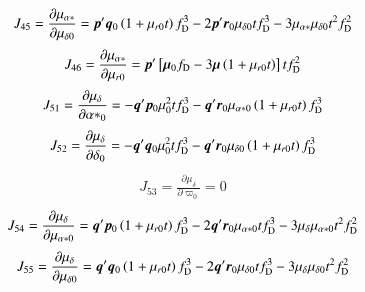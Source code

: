 \documentclass{aa}
\def\vec#1{\ensuremath{\mathchoice{\mbox{\boldmath$\displaystyle#1$}}
{\mbox{\boldmath$\textstyle#1$}}
{\mbox{\boldmath$\scriptstyle#1$}}
{\mbox{\boldmath$\scriptscriptstyle#1$}}}}
\begin{document}
\begin{equation*}
 \begin{aligned}
    J_{45}=\frac{\partial\mu_{\alpha*}}{\partial\mu_{\delta0}} =
    \vec{p}'\vec{q}_0\left(1+\mu_{r0}t\right)f_\mathrm{D}^3
    -2\vec{p}'\vec{r}_0\mu_{\delta0}tf_\mathrm{D}^3
    -3\mu_{\alpha*}\mu_{\delta0}t^2f_\mathrm{D}^2 \\
 \end{aligned}
\end{equation*}
\begin{equation*}
 \begin{aligned}
    J_{46}=\frac{\partial\mu_{\alpha*}}{\partial\mu_{r0}}=
    \vec{p}'\left[\vec{\mu}_0f_\mathrm{D}-3\vec{\mu}\left(1+\mu_{r0}t\right)\right]tf_\mathrm{D}^2
 \end{aligned}
\end{equation*}
\begin{equation*}
 \begin{aligned}
    J_{51}=\frac{\partial\mu_\delta}{\partial{\alpha*}_0}=
    -\vec{q}'\vec{p}_0\mu_0^2tf_\mathrm{D}^3
    -\vec{q}'\vec{r}_0\mu_{\alpha*0}\left(1+\mu_{r0}t\right)f_\mathrm{D}^3
 \end{aligned}
\end{equation*}
\begin{equation*}
 \begin{aligned}
    J_{52}=\frac{\partial\mu_\delta}{\partial\delta_0}=
    -\vec{q}'\vec{q}_0\mu_0^2tf_\mathrm{D}^3
    -\vec{q}'\vec{r}_0\mu_{\delta0}\left(1+\mu_{r0}t\right)f_\mathrm{D}^3
 \end{aligned}
\end{equation*}
\begin{equation*}
 \begin{aligned}
    J_{53}=\frac{\partial\mu_\delta}{\partial\varpi_0}=0
 \end{aligned}
\end{equation*}
\begin{equation*}
 \begin{aligned}
    J_{54}=\frac{\partial\mu_\delta}{\partial\mu_{\alpha*0}} =
    \vec{q}'\vec{p}_0\left(1+\mu_{r0}t\right)f_\mathrm{D}^3
    -2\vec{q}'\vec{r}_0\mu_{\alpha*0}tf_\mathrm{D}^3
    -3\mu_\delta\mu_{\alpha*0}t^2f_\mathrm{D}^2 \\
 \end{aligned}
\end{equation*}
\begin{equation*}
 \begin{aligned}
    J_{55}=\frac{\partial\mu_\delta}{\partial\mu_{\delta0}} =
    \vec{q}'\vec{q}_0\left(1+\mu_{r0}t\right)f_\mathrm{D}^3
    -2\vec{q}'\vec{r}_0\mu_{\delta0}tf_\mathrm{D}^3
    -3\mu_\delta\mu_{\delta0}t^2f_\mathrm{D}^2 \\
 \end{aligned}
\end{equation*}
\end{document}
